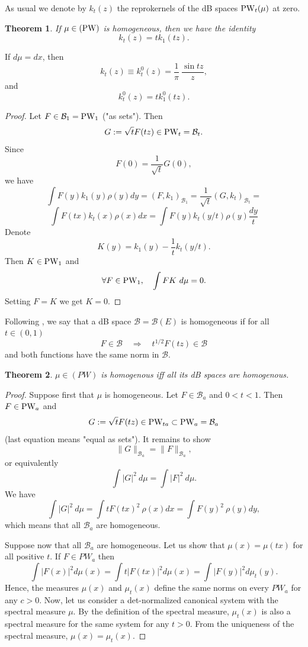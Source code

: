 \documentclass[11pt,twoside,reqno]{amsart}
\def\PW{\text{\rm PW}}
\def\ms{\bigskip}
\def\ss{\smallskip}
\def\ms{\medskip}
\def\no{\noindent}
\def\BB{{\mathcal B}}
\theoremstyle{plain}
\newtheorem{theorem}{Theorem}
\numberwithin{equation}{section}
\begin{document}
As usual we denote by $k_t(z)$ the reprokernels of the dB spaces $\PW_t(\mu)$ at zero.
\begin{theorem}   If $\mu\in (\PW)$ is homogeneous, then we have the identity
$$k_t(z)=tk_1(tz).$$
 \end{theorem}
 
 \ss\no{\bf Example.}  If $d\mu=dx$, then 
 $$k_t(z)\equiv k_t^0(z)=\frac1\pi~\frac {\sin tz}z,$$
 and 
 $$k_t^0(z)=tk_1^0(tz).$$ 
 \ms
 \begin{proof} Let $F\in\BB_1=\PW_1$ ("as sets"). Then $$G:=\sqrt t F(tz)\in \PW_t=\BB_t.$$
 Since
 $$F(0)=\frac1{\sqrt t}G(0),$$
 we have
 $$\int F(y)k_1(y)\rho(y)dy=(F,k_1)_{\BB_1}=\frac1{\sqrt t} (G,k_t)_{\BB_t}=$$
 $$\int F(tx)k_t(x)\rho(x)dx=\int F(y)k_t(y/t)\rho(y)\frac{dy}t$$
Denote
$$K(y)=k_1(y)-\frac1tk_t(y/t).$$
Then $ K\in \PW_1$ and 
$$\forall F\in \PW_1,\quad \int FK~d\mu=0.$$
Setting $F=K$ we get $K=0$.
 \end{proof}
 
\ms\no Following \cite{dB},  we say that a dB space $\BB=\BB(E)$ is homogeneous   if for all $t\in(0,1)$
$$F\in \BB\quad\Rightarrow\quad  t ^{1/2} F(tz)\in\BB$$
and both functions have the same norm in $\BB$.

\begin{theorem}\label{thm2}  $\mu\in(PW)$ is homogenous iff all its dB spaces are homogenous. \end{theorem}
\begin{proof} 
	
Suppose first that $\mu$ is homogeneous.	Let $F\in \BB_a$ and $0<t<1$. Then
$F\in \PW_a$ and 
$$G:=\sqrt t F(tz)\in\PW_{ta}\subset \PW_a=\BB_a$$
(last equation means "equal as sets"). It remains to show
$$\|G\|_{\BB_a}=
\|F\|_{\BB_a},$$  or equivalently
$$\int |G|^2~d\mu=\int |F|^2~d\mu.$$
We have
$$\int |G|^2~d\mu=\int tF(tx)^2~\rho(x)dx=\int F(y)^2~\rho(y)dy,$$
which means that all $\BB_a$ are homogeneous.

Suppose now that all $\BB_a$ are homogeneous. Let us show that $\mu(x)=\mu(tx)$ for all positive $t$.
If $F\in PW_a$ then
$$\int |F(x)|^2d\mu(x)=\int t|F(tx)|^2d\mu(x)=\int |F(y)|^2d\mu_t(y).$$
Hence, the measures $\mu(x)$ and $\mu_t(x)$ define the same norms on every $PW_a$ for any $c>0$.
Now, let us consider a det-normalized canonical system with the spectral measure $\mu$. 
By the definition of the spectral measure, $\mu_t(x)$ is also a spectral measure for the same system for any $t>0$.
From the uniqueness of the spectral measure, $\mu(x)=\mu_t(x)$.


\end{proof}
\end{document}
